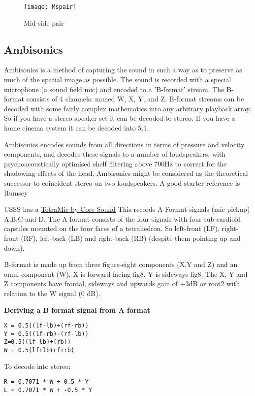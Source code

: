 \begin{figure}[H]
\centering
\texttt{[image: Mspair]}\caption{Mid-side pair}
\label{fig:midsidepair}
\end{figure}


\subsection{Ambisonics}
Ambisonics is a method of capturing the sound in such a way as to preserve as much of the spatial image as possible. The sound is recorded with a special microphone (a sound field mic) and encoded to a 'B-format' stream. The B-format consists of 4 channels: named W, X, Y, and Z. B-format streams can be decoded with some fairly complex mathematics into any arbitrary playback array. So if you have a stereo speaker set it can be decoded to stereo. If you have a home cinema system it can be decoded into 5.1.


Ambisonics encodes sounds from all directions in terms of pressure and velocity components, and decodes these signals to a number of loudspeakers, with psychoacoustically optimised shelf filtering above 700Hz to correct for the shadowing effects of the head. Ambisonics might be considered as the theoretical successor to coincident stereo on two loudspeakers. A good starter reference is Rumsey \citep[pp402-407]{rumsey2006sound} 

USSS has a \href{http://www.core-sound.com/TetraMic/1.php}{TetraMic by Core Sound}
This records A-Format signals (mic pickup) A,B,C and D. The A format consists of the four signals with four sub-cardioid capsules mounted on the four faces of a tetrahedron. So left-front (LF), right-front (RF), left-back (LB) and right-back (RB) (despite them pointing up and down). 

B-format is made up from three figure-eight components (X,Y and Z) and an omni component (W). X is forward facing fig8. Y is sideways fig8. The X, Y and Z components have frontal, sideways and upwards gain of +3dB or root2 with relation to the W signal (0 dB). 

\textbf{Deriving a B format signal from A format}
\begin{verbatim} 
X = 0.5((lf-lb)+(rf-rb))
Y = 0.5((lf-rb)-(rf-lb))
Z=0.5((lf-lb)+(rb))
W = 0.5(lf+lb+rf+rb)
\end{verbatim} 

To decode into stereo:
\begin{verbatim} 
R = 0.7071 * W + 0.5 * Y
L = 0.7071 * W + -0.5 * Y
\end{verbatim}

